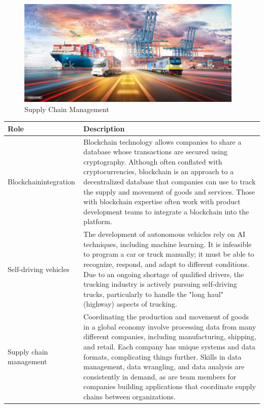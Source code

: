 \begin{figure}[H]
	\begin{center}
		\caption{Supply Chain Management}
		\vskip 4pt
		\includegraphics[height=2in]{images/careers/istockphoto-1399747292-1024x1024.jpg}
	\end{center}
\end{figure}

\begin{table}[H]
	\begin{center}
		\begin{tabular}{p{1in}|p{3.4in}} 
			\textbf{Role} & \textbf{Description}\\
			\hline
			Blockchain\linebreak integration & Blockchain technology allows companies to share a database whose transactions are secured using cryptography. Although often conflated with cryptocurrencies, blockchain is an approach to a decentralized database that companies can use to track the supply and movement of goods and services. Those with blockchain expertise often work with product development teams to integrate a blockchain into the platform.\\
			\hline
			Self-driving vehicles & The development of autonomous vehicles rely on AI techniques, including machine learning. It is infeasible to program a car or truck manually; it must be able to recognize, respond, and adapt to different conditions. Due to an ongoing shortage of qualified drivers, the trucking industry is actively pursuing self-driving trucks, particularly to handle the "long haul" (highway) aspects of trucking.\\
			\hline
			Supply chain management & Coordinating the production and movement of goods in a global economy involve processing data from many different companies, including manufacturing, shipping, and retail. Each company has unique systems and data formats, complicating things further. Skills in data management, data wrangling, and data analysis are consistently in demand, as are team members for companies building applications that coordinate supply chains between organizations.\\
			\hline
		\end{tabular}
	\end{center}
\end{table}

